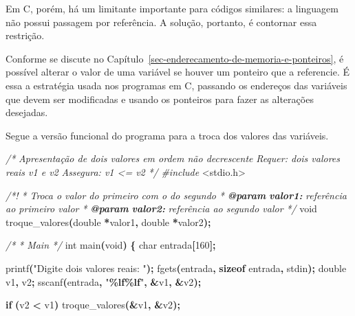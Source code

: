 \documentclass[
  11pt,
  a4paper,
]{scrbook}
\newenvironment{Shaded}{\begin{snugshade}}{\end{snugshade}}
\newcommand{\AnnotationTok}[1]{\textcolor[rgb]{0.56,0.35,0.01}{\textbf{\textit{#1}}}}
\newcommand{\CommentTok}[1]{\textcolor[rgb]{0.56,0.35,0.01}{\textit{#1}}}
\newcommand{\CommentVarTok}[1]{\textcolor[rgb]{0.56,0.35,0.01}{\textbf{\textit{#1}}}}
\newcommand{\ControlFlowTok}[1]{\textcolor[rgb]{0.13,0.29,0.53}{\textbf{#1}}}
\newcommand{\DataTypeTok}[1]{\textcolor[rgb]{0.13,0.29,0.53}{#1}}
\newcommand{\DecValTok}[1]{\textcolor[rgb]{0.00,0.00,0.81}{#1}}
\newcommand{\ImportTok}[1]{#1}
\newcommand{\KeywordTok}[1]{\textcolor[rgb]{0.13,0.29,0.53}{\textbf{#1}}}
\newcommand{\NormalTok}[1]{#1}
\newcommand{\OperatorTok}[1]{\textcolor[rgb]{0.81,0.36,0.00}{\textbf{#1}}}
\newcommand{\PreprocessorTok}[1]{\textcolor[rgb]{0.56,0.35,0.01}{\textit{#1}}}
\newcommand{\SpecialCharTok}[1]{\textcolor[rgb]{0.81,0.36,0.00}{\textbf{#1}}}
\newcommand{\StringTok}[1]{\textcolor[rgb]{0.31,0.60,0.02}{#1}}
\begin{document}
Em C, porém, há um limitante importante para códigos similares: a
linguagem não possui passagem por referência. A solução, portanto, é
contornar essa restrição.

Conforme se discute no
Capítulo~\ref{sec-enderecamento-de-memoria-e-ponteiros}, é possível
alterar o valor de uma variável se houver um ponteiro que a referencie.
É essa a estratégia usada nos programas em C, passando os endereços das
variáveis que devem ser modificadas e usando os ponteiros para fazer as
alterações desejadas.

Segue a versão funcional do programa para a troca dos valores das
variáveis.

\begin{Shaded}
\begin{Highlighting}[]
\CommentTok{/*}
\CommentTok{Apresentação de dois valores em ordem não decrescente}
\CommentTok{Requer: dois valores reais v1 e v2}
\CommentTok{Assegura: v1 \textless{}= v2}
\CommentTok{*/}
\PreprocessorTok{\#include }\ImportTok{\textless{}stdio.h\textgreater{}}

\CommentTok{/*!}
\CommentTok{ * Troca o valor do primeiro com o do segundo}
\CommentTok{ * }\AnnotationTok{@param}\CommentTok{ }\CommentVarTok{valor1:}\CommentTok{ referência ao primeiro valor}
\CommentTok{ * }\AnnotationTok{@param}\CommentTok{ }\CommentVarTok{valor2:}\CommentTok{ referência ao segundo valor}
\CommentTok{ */}
\DataTypeTok{void}\NormalTok{ troque\_valores}\OperatorTok{(}\DataTypeTok{double} \OperatorTok{*}\NormalTok{valor1}\OperatorTok{,} \DataTypeTok{double} \OperatorTok{*}\NormalTok{valor2}\OperatorTok{);}

\CommentTok{/*}
\CommentTok{ * Main}
\CommentTok{ */}
\DataTypeTok{int}\NormalTok{ main}\OperatorTok{(}\DataTypeTok{void}\OperatorTok{)} \OperatorTok{\{}
    \DataTypeTok{char}\NormalTok{ entrada}\OperatorTok{[}\DecValTok{160}\OperatorTok{];}

\NormalTok{    printf}\OperatorTok{(}\StringTok{"Digite dois valores reais: "}\OperatorTok{);}
\NormalTok{    fgets}\OperatorTok{(}\NormalTok{entrada}\OperatorTok{,} \KeywordTok{sizeof}\NormalTok{ entrada}\OperatorTok{,}\NormalTok{ stdin}\OperatorTok{);}
    \DataTypeTok{double}\NormalTok{ v1}\OperatorTok{,}\NormalTok{ v2}\OperatorTok{;}
\NormalTok{    sscanf}\OperatorTok{(}\NormalTok{entrada}\OperatorTok{,} \StringTok{"}\SpecialCharTok{\%lf\%lf}\StringTok{"}\OperatorTok{,} \OperatorTok{\&}\NormalTok{v1}\OperatorTok{,} \OperatorTok{\&}\NormalTok{v2}\OperatorTok{);}

    \ControlFlowTok{if} \OperatorTok{(}\NormalTok{v2 }\OperatorTok{\textless{}}\NormalTok{ v1}\OperatorTok{)}
\NormalTok{        troque\_valores}\OperatorTok{(\&}\NormalTok{v1}\OperatorTok{,} \OperatorTok{\&}\NormalTok{v2}\OperatorTok{);}


\end{Highlighting}
\end{Shaded}
\end{document}
